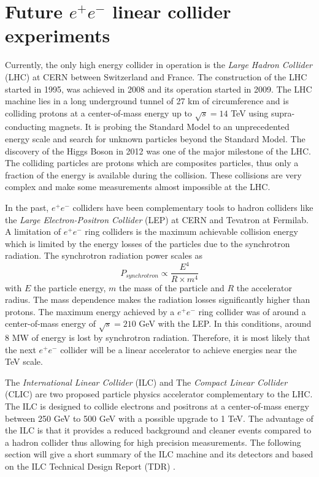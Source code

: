 \chapter{Future $e^+e^-$ linear collider experiments}
\label{chap:FutureColliders}

Currently, the only high energy collider in operation is the \textit{Large Hadron Collider} (LHC) at CERN between Switzerland and France. The construction of the LHC started in 1995, was achieved in 2008 and its operation started in 2009. The LHC machine lies in a long underground tunnel of 27 km of circumference and is colliding protons at a center-of-mass energy up to $\sqrt{s} = 14$ TeV using supra-conducting magnets. It is probing the Standard Model to an unprecedented energy scale and search for unknown particles beyond the Standard Model. The discovery of the Higgs Boson in 2012 was one of the major milestone of the LHC. The colliding particles are protons which are composites particles, thus only a fraction of the energy is available during the collision. These collisions are very complex and make some measurements almost impossible at the LHC.

In the past, $e^+e^-$ colliders have been complementary tools to hadron colliders like the \textit{Large Electron-Positron Collider} (LEP) at CERN and Tevatron at Fermilab. A limitation of $e^+e^-$ ring colliders is the maximum achievable collision energy which is limited by the energy losses of the particles due to the synchrotron radiation. The synchrotron radiation power scales as
\begin{equation}
  P_{synchrotron} \propto \frac{E^4}{R \times m^4}
\end{equation}
with $E$ the particle energy, $m$ the mass of the particle and $R$ the accelerator radius. The mass dependence makes the radiation losses significantly higher than protons. The maximum energy achieved by a $e^+e^-$ ring collider was of around a center-of-mass energy of $\sqrt{s} = 210$ GeV with the LEP. In this conditions, around 8 MW of energy is lost by synchrotron radiation.
Therefore, it is most likely that the next $e^+e^-$ collider will be a linear accelerator to achieve energies near the TeV scale.

The \textit{International Linear Collider} (ILC) and The \textit{Compact Linear Collider} (CLIC) are two proposed particle physics accelerator complementary to the LHC. The ILC is designed to collide electrons and positrons at a center-of-mass energy between 250 GeV to 500 GeV with a possible upgrade to 1 TeV. The advantage of the ILC is that it provides a reduced background and cleaner events compared to a hadron collider thus allowing for high precision measurements. The following section will give a short summary of the ILC machine and its detectors and based on the ILC Technical Design Report (TDR) \cite{ILC_TDR_Vol1, ILC_TDR_Vol2, ILC_TDR_Vol3.1, ILC_TDR_Vol3.2, ILC_TDR_Vol4}.

